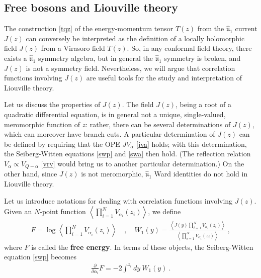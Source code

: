 \documentclass[12pt,a4paper,notitlepage]{report}
\numberwithin{equation}{section}
\theoremstyle{break}
\begin{document}
\subsection{Free bosons and Liouville theory \label{seclld}}

The construction \eqref{tqz} of the energy-momentum tensor $T(z)$ from the $\hat{\mathfrak{u}}_1$ current $J(z)$ can conversely be interpreted as the definition of a locally holomorphic field $J(z)$ from a Virasoro field $T(z)$.
So, in any conformal field theory, there exists a $\hat{\mathfrak{u}}_1$ symmetry algebra, but in general the $\hat{\mathfrak{u}}_1$ symmetry is broken, and $J(z)$ is not a symmetry field.
Nevertheless, we will argue that correlation functions involving $J(z)$ are useful tools for the study and interpretation of Liouville theory. 

Let us discuss the properties of $J(z)$.
The field $J(z)$, being a root of a quadratic differential equation, is in general not a unique, single-valued, meromorphic function of $z$: rather, there can be several determinations of $J(z)$, which can moreover have branch cuts. 
A particular determination of $J(z)$ can be defined by requiring that the 
OPE $JV_\alpha$ \eqref{jva} holds; with this determination, the Seiberg-Witten equations \eqref{swp} and \eqref{swa} then hold.  
(The reflection relation $V_\alpha \propto V_{Q-\alpha}$ \eqref{vrv} would bring us to another particular determination.)
On the other hand, since $J(z)$ is not meromorphic, $\hat{\mathfrak{u}}_1$ Ward identities do not hold in Liouville theory.

Let us introduce notations for dealing with correlation functions involving $J(z)$. 
Given an $N$-point function $\left\langle \prod_{i=1}^N V_{\alpha_i}(z_i) \right\rangle$, we define
\begin{align}
 \boxed{F= \log \left\langle \prod_{i=1}^N V_{\alpha_i}(z_i) \right\rangle} \quad , \quad \boxed{W_1(y) = \frac{\left\langle J(y)\prod_{i=1}^N V_{\alpha_i}(z_i) \right\rangle}{\left\langle \prod_{i=1}^N V_{\alpha_i}(z_i) \right\rangle}} \ ,
\end{align}
where $F$ is called the \textbf{\boldmath free energy}. 
In terms of these objects, the Seiberg-Witten equation \eqref{swp} becomes 
\begin{align}
 {\frac{\partial}{\partial \alpha_i}} F = -2 \int^{z_i} dy \ W_1(y)\ . 
\label{daf}
\end{align}
\end{document}
